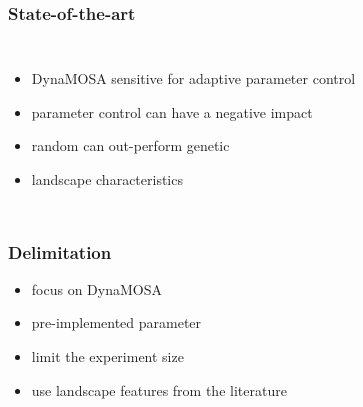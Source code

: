 \begin{frame}
	\frametitle{State-of-the-art}
	
	\begin{columns}[c]
		
		\column{\textwidth}
		\begin{itemize}
			\item DynaMOSA sensitive for adaptive parameter control \cite{Wetzler.2020}
			\item parameter control can have a negative impact \cite{Paterson.2015}
			\item random can out-perform genetic \cite{Shamshiri.2015}
			\item landscape characteristics \cite{Albunian.2020}
		\end{itemize}
		
	\end{columns}
	
\end{frame}

\begin{frame}
	\frametitle{Delimitation}
	
	\begin{itemize}
		\item focus on DynaMOSA
		\item pre-implemented parameter
		\item limit the experiment size
		\item use landscape features from the literature
	\end{itemize}
	
\end{frame}

